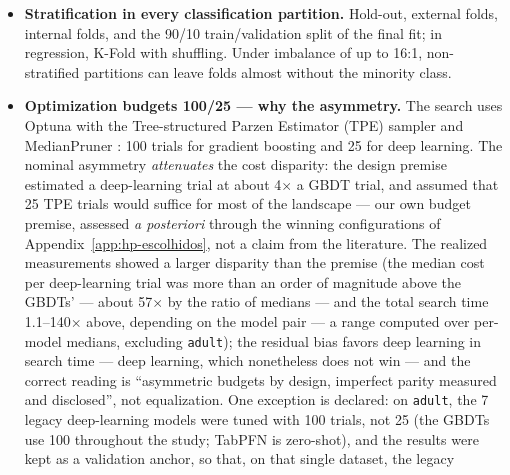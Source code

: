 \begin{itemize}
    and the networks' early stopping uses the fold under evaluation
    itself. This design is \emph{not} classical nested
    cross-validation --- there, the search would repeat inside each
    external fold. The consequence is circumscribed, and it is worth
    stating precisely: the external-fold metrics are optimistic as
    generalization estimates, because selection observed those same
    data; here they play only internal roles (stability across
    folds, Appendix~\ref{app:tabelas}) and \textbf{no reported
    result comes from them} --- all come from the prior hold-out,
    which no selection stage ever observes.
  \item \textbf{Stratification in every classification partition.}
    Hold-out, external folds, internal folds, and the 90/10
    train/validation split of the final fit; in regression, K-Fold
    with shuffling. Under imbalance of up to 16:1, non-stratified
    partitions can leave folds almost without the minority class.
  \item \textbf{Optimization budgets 100/25 --- why the asymmetry.}
    The search uses Optuna with the Tree-structured Parzen Estimator
    (TPE) sampler and MedianPruner
    \citep{akiba2019}: 100 trials for gradient boosting and 25 for
    deep learning. The nominal asymmetry \emph{attenuates} the cost
    disparity: the design premise estimated a deep-learning trial at
    about 4$\times$ a GBDT trial, and assumed that 25 TPE trials
    would suffice for most of the landscape ---
    our own budget premise, assessed \emph{a posteriori} through the
    winning configurations of
    Appendix~\ref{app:hp-escolhidos}, not a claim from the
    literature. The realized measurements showed a larger disparity
    than the premise (the median cost per deep-learning trial was more
    than an order of magnitude above the GBDTs' --- about 57$\times$
    by the ratio of medians --- and the total search time
    1.1--140$\times$ above, depending on the model pair --- a range
    computed over per-model medians, excluding \texttt{adult}); the
    residual bias favors deep learning in search time ---
    deep learning, which nonetheless does not win --- and the
    correct reading is
    ``asymmetric budgets by design, imperfect parity measured and
    disclosed'', not equalization. One exception is declared: on
    \texttt{adult}, the 7 legacy deep-learning models were tuned
    with 100 trials, not 25 (the GBDTs use 100 throughout the study;
    TabPFN is zero-shot), and the results were kept as a
    validation anchor, so that, on that single dataset, the legacy

\end{itemize}
